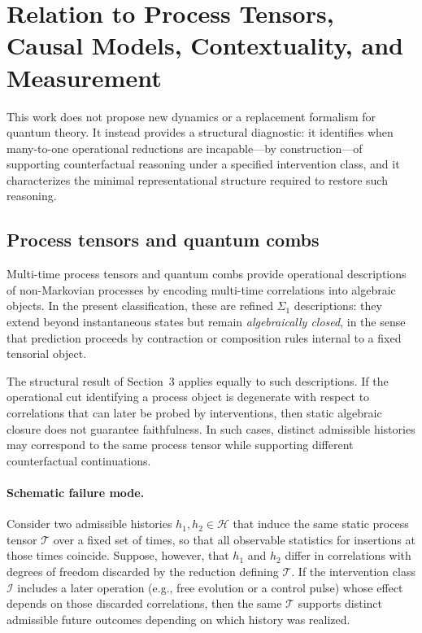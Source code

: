 \section{Relation to Process Tensors, Causal Models, Contextuality, and Measurement}
\label{sec:relations}

This work does not propose new dynamics or a replacement formalism for quantum theory. It instead
provides a structural diagnostic: it identifies when many-to-one operational reductions are
incapable—by construction—of supporting counterfactual reasoning under a specified intervention
class, and it characterizes the minimal representational structure required to restore such
reasoning.

\subsection{Process tensors and quantum combs}

Multi-time process tensors and quantum combs provide operational descriptions of non-Markovian
processes by encoding multi-time correlations into algebraic objects. In the present classification,
these are refined $\Sigma_1$ descriptions: they extend beyond instantaneous states but remain
\emph{algebraically closed}, in the sense that prediction proceeds by contraction or composition
rules internal to a fixed tensorial object.

The structural result of Section~3 applies equally to such descriptions. If the operational cut
identifying a process object is degenerate with respect to correlations that can later be probed
by interventions, then static algebraic closure does not guarantee faithfulness. In such cases,
distinct admissible histories may correspond to the same process tensor while supporting different
counterfactual continuations.

\paragraph{Schematic failure mode.}
Consider two admissible histories $h_1,h_2\in\mathcal{H}$ that induce the same static process tensor
$\mathcal{T}$ over a fixed set of times, so that all observable statistics for insertions at those
times coincide. Suppose, however, that $h_1$ and $h_2$ differ in correlations with degrees of freedom
discarded by the reduction defining $\mathcal{T}$. If the intervention class $\mathcal{I}$ includes
a later operation (e.g., free evolution or a control pulse) whose effect depends on those discarded
correlations, then the same $\mathcal{T}$ supports distinct admissible future outcomes depending on
which history was realized.

